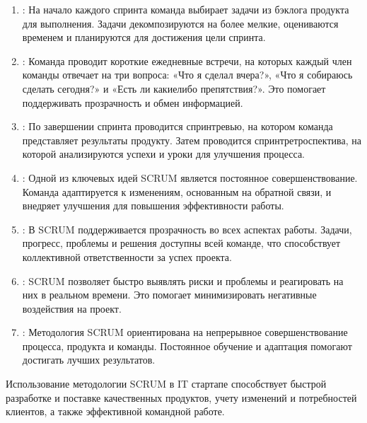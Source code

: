 \documentclass[letterpaper,10pt,russian]{sphinxmanual}
\begin{document}
\begin{enumerate}
\item {} 
\sphinxAtStartPar
{}: На начало каждого спринта команда выбирает задачи из бэклога продукта для выполнения. Задачи декомпозируются на более мелкие, оцениваются временем и планируются для достижения цели спринта.

\item {} 
\sphinxAtStartPar
{}: Команда проводит короткие ежедневные встречи, на которых каждый член команды отвечает на три вопроса: «Что я сделал вчера?», «Что я собираюсь сделать сегодня?» и «Есть ли какие\sphinxhyphen{}либо препятствия?». Это помогает поддерживать прозрачность и обмен информацией.

\item {} 
\sphinxAtStartPar
{}: По завершении спринта проводится спринт\sphinxhyphen{}ревью, на котором команда представляет результаты продукту. Затем проводится спринт\sphinxhyphen{}ретроспектива, на которой анализируются успехи и уроки для улучшения процесса.

\item {} 
\sphinxAtStartPar
{}: Одной из ключевых идей SCRUM является постоянное совершенствование. Команда адаптируется к изменениям, основанным на обратной связи, и внедряет улучшения для повышения эффективности работы.

\item {} 
\sphinxAtStartPar
{}: В SCRUM поддерживается прозрачность во всех аспектах работы. Задачи, прогресс, проблемы и решения доступны всей команде, что способствует коллективной ответственности за успех проекта.

\item {} 
\sphinxAtStartPar
{}: SCRUM позволяет быстро выявлять риски и проблемы и реагировать на них в реальном времени. Это помогает минимизировать негативные воздействия на проект.

\item {} 
\sphinxAtStartPar
{}: Методология SCRUM ориентирована на непрерывное совершенствование процесса, продукта и команды. Постоянное обучение и адаптация помогают достигать лучших результатов.

\end{enumerate}

\sphinxAtStartPar
Использование методологии SCRUM в IT стартапе способствует быстрой разработке и поставке качественных продуктов, учету изменений и потребностей клиентов, а также эффективной командной работе.
\end{document}
